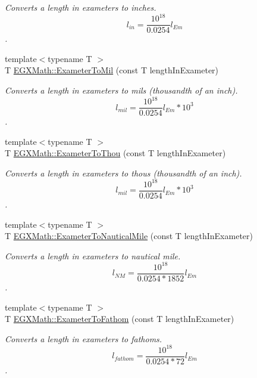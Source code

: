 \begin{DoxyCompactItemize}
\begin{DoxyCompactList}\small\item\em Converts a length in exameters to inches. \[ l_{in}= \frac{10^{18}}{0.0254} l_{Em} \]. \end{DoxyCompactList}\item 
{\footnotesize template$<$typename T $>$ }\\T \mbox{\hyperlink{group___e_g_x_math-_conversions-_length_conversions-_s_i-_exameter-_imperial_ga863f9f7f7e2826324fec642027c48614}{E\+G\+X\+Math\+::\+Exameter\+To\+Mil}} (const T length\+In\+Exameter)
\begin{DoxyCompactList}\small\item\em Converts a length in exameters to mils (thousandth of an inch). \[ l_{mil}= \frac{10^{18}}{0.0254} l_{Em} * 10^{3} \]. \end{DoxyCompactList}\item 
{\footnotesize template$<$typename T $>$ }\\T \mbox{\hyperlink{group___e_g_x_math-_conversions-_length_conversions-_s_i-_exameter-_imperial_gafee1930a425fcae4f9a3d8631aa62b05}{E\+G\+X\+Math\+::\+Exameter\+To\+Thou}} (const T length\+In\+Exameter)
\begin{DoxyCompactList}\small\item\em Converts a length in exameters to thous (thousandth of an inch). \[ l_{mil}= \frac{10^{18}}{0.0254} l_{Em} * 10^{3} \]. \end{DoxyCompactList}\item 
{\footnotesize template$<$typename T $>$ }\\T \mbox{\hyperlink{group___e_g_x_math-_conversions-_length_conversions-_s_i-_exameter-_nautical_gaf593ae9d78bd889caca4e9249be1464a}{E\+G\+X\+Math\+::\+Exameter\+To\+Nautical\+Mile}} (const T length\+In\+Exameter)
\begin{DoxyCompactList}\small\item\em Converts a length in exameters to nautical mile. \[ l_{NM}= \frac{10^{18}}{0.0254 * 1852} l_{Em} \]. \end{DoxyCompactList}\item 
{\footnotesize template$<$typename T $>$ }\\T \mbox{\hyperlink{group___e_g_x_math-_conversions-_length_conversions-_s_i-_exameter-_nautical_gab6f73111fd59a46fb28473d73ddb6033}{E\+G\+X\+Math\+::\+Exameter\+To\+Fathom}} (const T length\+In\+Exameter)
\begin{DoxyCompactList}\small\item\em Converts a length in exameters to fathoms. \[ l_{fathom}= \frac{10^{18}}{0.0254 * 72} l_{Em} \]. \end{DoxyCompactList}\item 

\end{DoxyCompactItemize}
